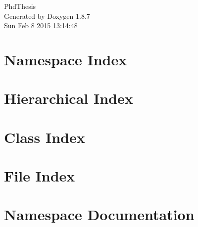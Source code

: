 \documentclass[twoside]{book}
\newcommand{\+}{\discretionary{\mbox{\scriptsize$\hookleftarrow$}}{}{}}
\newcommand{\clearemptydoublepage}{%
  \newpage{\pagestyle{empty}\cleardoublepage}%
}
\begin{document}
\hypersetup{pageanchor=false,
             bookmarks=true,
             bookmarksnumbered=true,
             pdfencoding=unicode
            }
\begin{titlepage}
\vspace*{7cm}
\begin{center}%
{\Large Phd\+Thesis }\\
\vspace*{1cm}
{\large Generated by Doxygen 1.8.7}\\
\vspace*{0.5cm}
{\small Sun Feb 8 2015 13:14:48}\\
\end{center}
\end{titlepage}
\clearemptydoublepage
\tableofcontents
\clearemptydoublepage
{}
\hypersetup{pageanchor=true}

\chapter{Namespace Index}

\chapter{Hierarchical Index}

\chapter{Class Index}

\chapter{File Index}

\chapter{Namespace Documentation}

\end{document}

